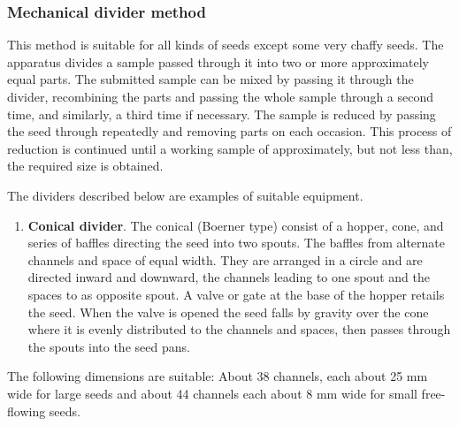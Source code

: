 \documentclass[]{book}
\providecommand{\tightlist}{%
  \setlength{\itemsep}{0pt}\setlength{\parskip}{0pt}}
\begin{document}
\subsubsection{Mechanical divider
method}\label{mechanical-divider-method}

This method is suitable for all kinds of seeds except some very chaffy
seeds. The apparatus divides a sample passed through it into two or more
approximately equal parts. The submitted sample can be mixed by passing
it through the divider, recombining the parts and passing the whole
sample through a second time, and similarly, a third time if necessary.
The sample is reduced by passing the seed through repeatedly and
removing parts on each occasion. This process of reduction is continued
until a working sample of approximately, but not less than, the required
size is obtained.

The dividers described below are examples of suitable equipment.

\begin{enumerate}
\def\labelenumi{\alph{enumi}.}
\tightlist
\item
  \textbf{Conical divider}. The conical (Boerner type) consist of a
  hopper, cone, and series of baffles directing the seed into two
  spouts. The baffles from alternate channels and space of equal width.
  They are arranged in a circle and are directed inward and downward,
  the channels leading to one spout and the spaces to as opposite spout.
  A valve or gate at the base of the hopper retails the seed. When the
  valve is opened the seed falls by gravity over the cone where it is
  evenly distributed to the channels and spaces, then passes through the
  spouts into the seed pans.
\end{enumerate}

The following dimensions are suitable: About 38 channels, each about 25
mm wide for large seeds and about 44 channels each about 8 mm wide for
small free- flowing seeds.
\end{document}
